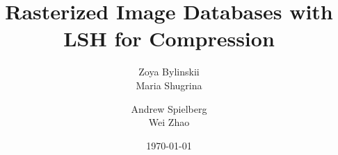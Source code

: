 \documentclass{vldb}
\begin{document}

\title{Rasterized Image Databases with LSH for Compression}



%
%
%
%


\author{
%
%
\alignauthor
Zoya Bylinskii\\
\alignauthor
Maria Shugrina\\
\and  %
\alignauthor
Andrew Spielberg\\
\alignauthor
Wei Zhao\\
}
\date{\today}
\end{document}
